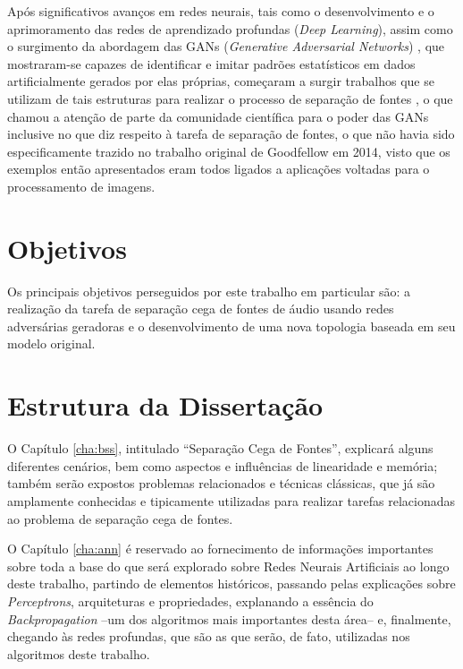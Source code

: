 Após significativos avanços em redes neurais, tais como o desenvolvimento e o aprimoramento das redes de aprendizado profundas (\textit{Deep Learning}), assim como o surgimento da abordagem das GANs (\textit{Generative Adversarial Networks}) \citep{NIPS2014_5423}, que mostraram-se capazes de identificar e imitar padrões estatísticos em dados artificialmente gerados por elas próprias, começaram a surgir trabalhos que se utilizam de tais estruturas para realizar o processo de separação de fontes \citep{subakan2018generative, kaneko2018generative, fan2018svsgan}, o que chamou a atenção de parte da comunidade científica para o poder das GANs inclusive no que diz respeito à tarefa de separação de fontes, o que não havia sido especificamente trazido no trabalho original de Goodfellow em 2014, visto que os exemplos então apresentados eram todos ligados a aplicações voltadas para o processamento de imagens.


\section{Objetivos}
\label{sec:intro_objectives}

Os principais objetivos perseguidos por este trabalho em particular são: a realização da tarefa de separação cega de fontes de áudio usando redes adversárias geradoras e o desenvolvimento de uma nova topologia baseada em seu modelo original.


\section{Estrutura da Dissertação}
\label{sec:intro_dissertation_structure}

O Capítulo \ref{cha:bss}, intitulado ``Separação Cega de Fontes'', explicará alguns diferentes cenários, bem como aspectos e influências de linearidade e memória; também  serão expostos problemas relacionados e técnicas clássicas, que já são amplamente conhecidas e tipicamente utilizadas para realizar tarefas relacionadas ao problema de separação cega de fontes.

O Capítulo \ref{cha:ann} é reservado ao fornecimento de informações importantes sobre toda a base do que será explorado sobre Redes Neurais Artificiais ao longo deste trabalho, partindo de elementos históricos, passando pelas explicações sobre \textit{Perceptrons}, arquiteturas e propriedades, explanando a essência do \textit{Backpropagation} --um dos algoritmos mais importantes desta área-- e, finalmente, chegando às redes profundas, que são as que serão, de fato, utilizadas nos algoritmos deste trabalho.

